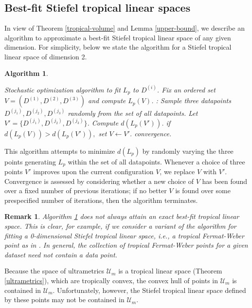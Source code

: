 \documentclass[12pt]{extarticle}
\numberwithin{theorem}{section}
\newtheorem{remark}[theorem]{Remark}
\newtheorem{algorithm}[theorem]{Algorithm}
\begin{document}
\subsection{Best-fit Stiefel tropical linear spaces}

In view of Theorem \ref{tropical-volume} and Lemma \ref{upper-bound}, we describe an algorithm to approximate a best-fit Stiefel tropical linear space of any given dimension. For simplicity, below we state the algorithm for a Stiefel tropical linear space of dimension 2.

\begin{algorithm}
\label{tropical-linear-space-algorithm}
\begin{algorithmic}
\State Stochastic optimization algorithm to fit $L_p$ to $D^{(i)}$.
\State Fix an ordered set $V = (D^{(1)}, D^{(2)}, D^{(3)})$ and compute $L_p(V)$. 
\Repeat:
	\State Sample three datapoints $D^{(j_1)}, D^{(j_2)}, D^{(j_3)}$ randomly from the set of all datapoints.
	\State Let $V' = \{D^{(j_1)}, D^{(j_2)}, D^{(j_3)}\}$.
	\State Compute $d(L_p(V'))$.
	\State if $d(L_p(V))>d(L_p(V')),$ set $V \gets V'$.
\Until convergence.
\end{algorithmic}
\end{algorithm}

This algorithm attempts to minimize $d(L_p)$ by randomly varying the three points generating $L_p$ within the set of all datapoints. Whenever a choice of three points $V'$ improves upon the current configuration $V$, we replace $V$ with $V'$. Convergence is assessed by considering whether a new choice of $V$ has been found over a fixed number of previous iterations; if no better $V$ is found over some prespecified number of iterations, then the algorithm terminates.

\begin{remark}
Algorithm \ref{tropical-linear-space-algorithm} does not always attain an exact best-fit tropical linear space. This is clear, for example, if we consider a variant of the algorithm for fitting a 0-dimensional Stiefel tropical linear space, i.e., a tropical Fermat-Weber point as in \cite{LY}. In general, the collection of tropical Fermat-Weber points for a given dataset need not contain a data point.
\end{remark}

Because the space of ultrametrics $\mathcal U_m$ is a tropical linear space (Theorem \ref{ultrametrics}), which are tropically convex, the convex hull of points in $\mathcal U_m$ is contained in $\mathcal U_m$. Unfortunately, however, the Stiefel tropical linear space defined by these points may not be contained in $\mathcal U_m$.
\end{document}
